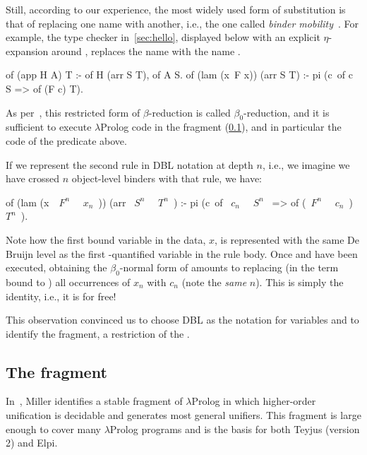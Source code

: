 \documentclass[a4paper, 11pt]{book}
\begin{document}
Still, according to our experience, the most widely used form of substitution
is that of replacing one name with another, i.e., the one called
\emph{binder mobility}~\cite{Miller2018MechanizedMR}. For example, the type
checker in~\cref{sec:hello}, displayed below with an explicit
$\eta$-expansion around , replaces the name  with the name
.

\begin{elpicode}
of (app H A) T :- of H (arr S T), of A S.
of (lam (x\ F x)) (arr S T) :- pi (c\ of c S => of (F c) T).
\end{elpicode}

\noindent

As per~\cite{10.1093/logcom/1.4.497}, this restricted form of $\beta$-reduction
is called $\beta_0$-reduction, and it is sufficient to execute $\lambda$Prolog
code in the \theotherfragment fragment (\cref{sec:llam}), and in particular the code of
the  predicate above.


If we represent the second rule in DBL notation at depth $n$, i.e., we imagine
we have crossed $n$ object-level binders with that rule, we have:

\begin{elpicode}
of (lam (x\ ~$F^n$~ ~$x_n$~)) (arr ~$S^n$~ ~$T^n$~) :-
  pi (c\ of ~$c_n$~ ~$S^n$~ => of (~$F^n$~ ~$c_n$~) ~$T^n$~).
\end{elpicode}

\noindent

Note how the first bound variable in the data, $x$, is represented with the
same De Bruijn level as the first -quantified variable in the rule
body. Once  and \elpi{=>} have been executed, obtaining the
$\beta_0$-normal form of  amounts to replacing (in the term
bound to ) all occurrences of $x_n$ with $c_n$ (note the \emph{same}
$n$). This is simply the identity, i.e., it is for free!


This observation convinced us to choose DBL as the notation for variables and
to identify the \thefragment fragment, a restriction of the \theotherfragment.

\subsection{The \theotherfragment fragment}\label{sec:llam}


In~\cite{10.1093/logcom/1.4.497}, Miller identifies a stable fragment of
$\lambda$Prolog in which higher-order unification is decidable and generates
most general unifiers. This fragment is large enough to cover many
$\lambda$Prolog programs and is the basis for both Teyjus (version 2) and
Elpi.
\end{document}
